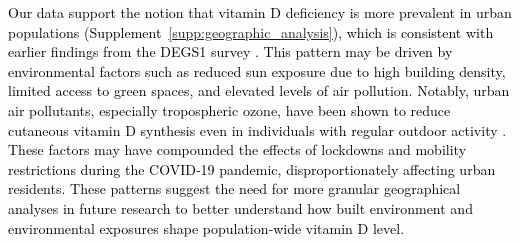 \documentclass[12pt]{article}
\newcommand{\REV}[1]{\textcolor{black}{#1}}
\begin{document}
\REV{Our data support the notion that vitamin D deficiency is more prevalent in urban populations (Supplement~\ref{supp:geographic_analysis}), which is consistent with earlier findings from the DEGS1 survey \cite{Rabenberg2015}. This pattern may be driven by environmental factors such as reduced sun exposure due to high building density, limited access to green spaces, and elevated levels of air pollution. Notably, urban air pollutants, especially tropospheric ozone, have been shown to reduce cutaneous vitamin D synthesis even in individuals with regular outdoor activity \cite{Manicourt2008}. These factors may have compounded the effects of lockdowns and mobility restrictions during the COVID‑19 pandemic, disproportionately affecting urban residents. These patterns suggest the need for more granular geographical analyses in future research to better understand how built environment and environmental exposures shape population‑wide vitamin D level.}

\end{document}
